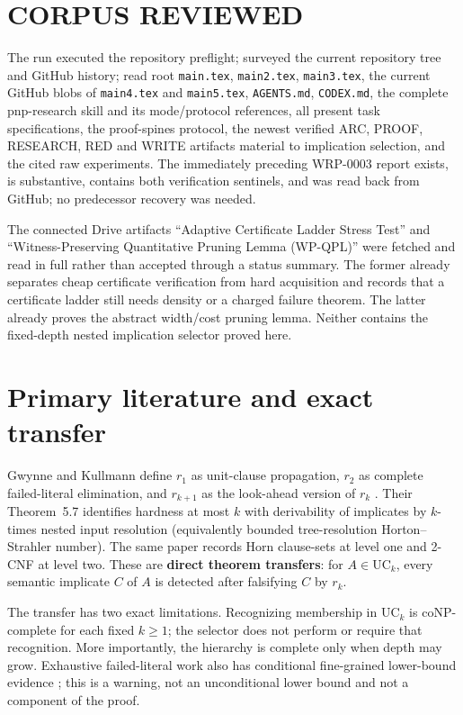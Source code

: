 \documentclass[11pt]{article}
\begin{document}
\section*{CORPUS REVIEWED}
The run executed the repository preflight; surveyed the current repository
tree and GitHub history; read root \texttt{main.tex}, \texttt{main2.tex},
\texttt{main3.tex}, the current GitHub blobs of \texttt{main4.tex} and
\texttt{main5.tex}, \texttt{AGENTS.md}, \texttt{CODEX.md}, the complete
pnp-research skill and its mode/protocol references, all present task
specifications, the proof-spines protocol, the newest verified ARC, PROOF,
RESEARCH, RED and WRITE artifacts material to implication selection, and the
cited raw experiments.  The immediately preceding WRP-0003 report exists,
is substantive, contains both verification sentinels, and was read back from
GitHub; no predecessor recovery was needed.

The connected Drive artifacts ``Adaptive Certificate Ladder Stress Test''
and ``Witness-Preserving Quantitative Pruning Lemma (WP-QPL)'' were fetched
and read in full rather than accepted through a status summary.  The former
already separates cheap certificate verification from hard acquisition and
records that a certificate ladder still needs density or a charged failure
theorem.  The latter already proves the abstract width/cost pruning lemma.
Neither contains the fixed-depth nested implication selector proved here.

\section*{Primary literature and exact transfer}
Gwynne and Kullmann define $r_1$ as unit-clause propagation, $r_2$ as
complete failed-literal elimination, and $r_{k+1}$ as the look-ahead version
of $r_k$ \cite{gwynne2014nested}.  Their Theorem~5.7 identifies hardness at
most $k$ with derivability of implicates by $k$-times nested input resolution
(equivalently bounded tree-resolution Horton--Strahler number).  The same
paper records Horn clause-sets at level one and 2-CNF at level two.  These are
\textbf{direct theorem transfers}: for $A\in\mathrm{UC}_k$, every semantic
implicate $C$ of $A$ is detected after falsifying $C$ by $r_k$.

The transfer has two exact limitations.  Recognizing membership in
$\mathrm{UC}_k$ is coNP-complete for each fixed $k\geq1$; the selector does
not perform or require that recognition.  More importantly, the hierarchy is
complete only when depth may grow.  Exhaustive failed-literal work also has
conditional fine-grained lower-bound evidence \cite{jarvisalo2014failed};
this is a warning, not an unconditional lower bound and not a component of
the proof.
\end{document}
